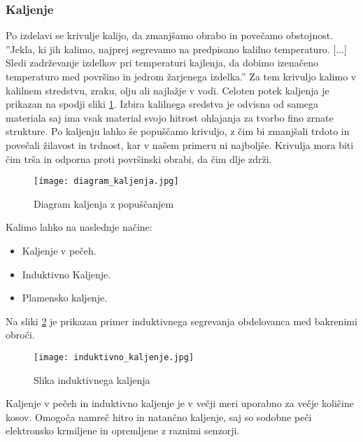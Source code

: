 \subsubsection{Kaljenje}
Po izdelavi se krivulje kalijo, da zmanjšamo obrabo in povečamo
obstojnost. ''Jekla, ki jih kalimo, najprej segrevamo na predpisano
kalilno temperaturo. [...] Sledi zadrževanje izdelkov pri temperaturi
kajlenja, da dobimo izenačeno temperaturo med površino in jedrom
žarjenega izdelka.'' \cite{gradiva}
Za tem krivuljo kalimo v kalilnem stredstvu, zraku, olju ali najlažje
v vodi. Celoten potek kaljenja je prikazan na spodji sliki \ref{diagram_kaljenja}.
Izbira kalilnega sredstva je odvisna od samega materiala
saj ima vsak material svojo hitrost ohlajanja za tvorbo fino zrnate strukture.
Po kaljenju lahko še popuščamo krivuljo, z čim bi zmanjšali trdoto
in povečali žilavost in trdnost, kar v našem primeru ni najboljše.
Krivulja mora biti čim trša in odporna proti površinski obrabi,
da čim dlje zdrži.

\begin{figure}[H]
	\begin{center}
		\texttt{[image: diagram\_kaljenja.jpg]}
		\caption{Diagram kaljenja z popuščanjem
			\cite{diagram_kaljenja}}
		\label{diagram_kaljenja}
	\end{center}
\end{figure}

Kalimo lahko na naslednje načine:
\begin{itemize}
	\item Kaljenje v pečeh.
	\item Induktivno Kaljenje.
	\item Plamensko kaljenje.
\end{itemize}

Na sliki \ref{induktivno_kaljenje} je prikazan primer induktivnega
segrevanja obdelovanca med bakrenimi obroči.

\begin{figure}[H]
	\begin{center}
		\texttt{[image: induktivno\_kaljenje.jpg]}
		\caption{Slika induktivnega kaljenja
			\cite{induktivno_kaljenje}}
		\label{induktivno_kaljenje}
	\end{center}
\end{figure}

Kaljenje v pečeh in induktivno kaljenje je v večji meri uporabno
za večje količine kosov. Omogoča namreč hitro in natančno kaljenje,
saj so sodobne peči elektronsko krmiljene in opremljene z raznimi senzorji.

